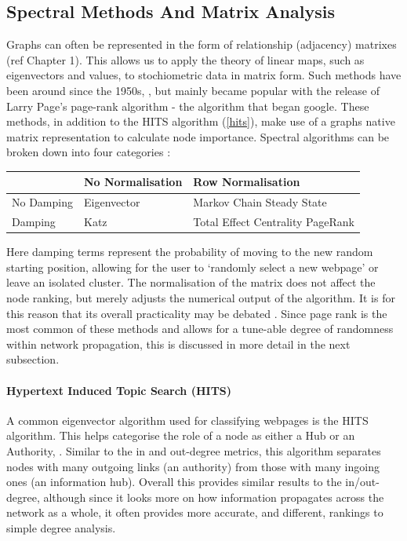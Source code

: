 %
\subsection{Spectral Methods And Matrix Analysis}

Graphs can often be represented in the form of relationship (adjacency) matrixes (ref Chapter 1). This allows us to apply the theory of linear maps, such as eigenvectors and values, to stochiometric data in matrix form. Such methods have been around since the 1950s, \citep{seeley}, but mainly became popular with the release of Larry Page's page-rank algorithm \citep{google} - the algorithm that began google. These methods, in addition to the HITS algorithm (\autoref{hits}), make use of a graphs native matrix representation to calculate node importance. Spectral algorithms can be broken down into four categories \citep{spectral}:

\begin{table}[H]
  \centering
\begin{tabular}{p{}||p{}| p{}}
\hline
 & No Normalisation  & Row Normalisation \\
 \hline \hline
No Damping & Eigenvector \citep{eigen, eigen2}  \: & Markov Chain Steady State \citep{seeley} \: \\ \hline
Damping & Katz \citep{katz} \: & Total Effect Centrality PageRank \citep{google} \\ \hline
\end{tabular}
\end{table}


Here damping terms represent the probability of moving to the new random starting position, allowing for the user to `randomly select a new webpage' or leave an isolated cluster. The normalisation of the matrix does not affect the node ranking, but merely adjusts the numerical output of the algorithm. It is for this reason that its overall practicality may be debated \citep{spectral}. Since page rank is the most common of these methods and allows for a tune-able degree of randomness within network propagation, this is discussed in more detail in the next subsection.



    \paragraph*{Hypertext Induced Topic Search (HITS)}\label{hits}
    A common eigenvector algorithm used for classifying webpages is the
    HITS algorithm. This helps categorise the role of a node as either a Hub or an Authority,
     \citep{hits,hitsvspagerank,hitsweb}. Similar to the in and out-degree metrics, this algorithm separates nodes with many outgoing links (an authority) from those with many ingoing ones (an information hub). Overall this provides similar results to the in/out-degree, although since it looks more on how information propagates across the network as a whole, it often provides more accurate, and different, rankings to simple degree analysis.






